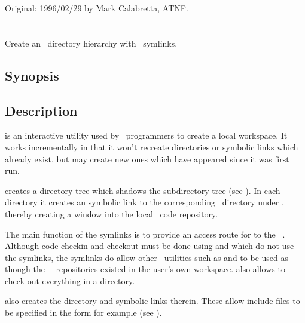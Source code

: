 Original: 1996/02/29 by Mark Calabretta, ATNF.


\newpage
\section{}
\label{mktree}

Create an \aipspp\ directory hierarchy with \rcs\ symlinks.

\subsection*{Synopsis}

\begin{synopsis}
\end{synopsis}

\subsection*{Description}

 is an interactive utility used by \aipspp\ programmers to
create a local workspace.  It works incrementally in that it won't recreate
directories or symbolic links which already exist, but may create new ones
which have appeared since it was first run.

 creates a directory tree which shadows the 
subdirectory tree (see ).  In each directory it creates an
 symbolic link to the corresponding \rcs\ directory under
, thereby creating a window into the local \aipspp\ code
repository.

The main function of the  symlinks is to provide an access route for
 to the \aipspp\ .  Although code checkin and
checkout must be done using  and  which do not use the
 symlinks, the symlinks do allow other \rcs\ utilities such as
 and  to be used as though the \aipspp\ \rcs\ 
repositories existed in the user's own workspace.   also allows
\code{ao RCS/*,v} to check out everything in a directory.

 also creates the  directory and symbolic links
therein.  These allow include files to be specified in the form
 for example (see ).

